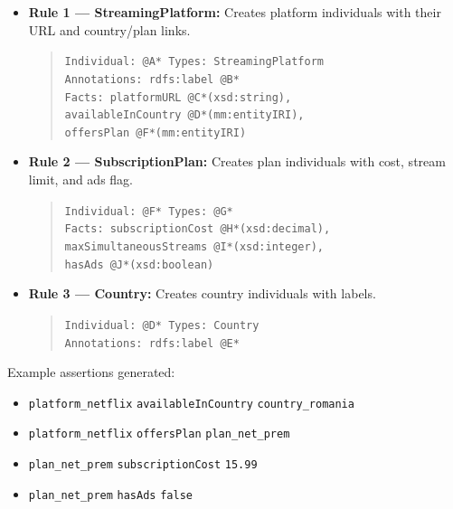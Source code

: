 \begin{itemize}
    \item \textbf{Rule 1 — StreamingPlatform:} Creates platform individuals with their URL and country/plan links.
    \begin{quote}\small
    \texttt{Individual: @A* \quad Types: StreamingPlatform}\\
    \texttt{Annotations: rdfs:label @B*}\\
    \texttt{Facts: platformURL @C*(xsd:string),}\\
    \texttt{\phantom{Facts: }availableInCountry @D*(mm:entityIRI),}\\
    \texttt{\phantom{Facts: }offersPlan @F*(mm:entityIRI)}
    \end{quote}

    \item \textbf{Rule 2 — SubscriptionPlan:} Creates plan individuals with cost, stream limit, and ads flag.
    \begin{quote}\small
    \texttt{Individual: @F* \quad Types: @G*}\\
    \texttt{Facts: subscriptionCost @H*(xsd:decimal),}\\
    \texttt{\phantom{Facts: }maxSimultaneousStreams @I*(xsd:integer),}\\
    \texttt{\phantom{Facts: }hasAds @J*(xsd:boolean)}
    \end{quote}

    \item \textbf{Rule 3 — Country:} Creates country individuals with labels.
    \begin{quote}\small
    \texttt{Individual: @D* \quad Types: Country}\\
    \texttt{Annotations: rdfs:label @E*}
    \end{quote}
\end{itemize}

\vspace{0.3cm}
\noindent Example assertions generated:
\begin{itemize}
    \item \texttt{platform\_netflix} \texttt{availableInCountry} \texttt{country\_romania}
    \item \texttt{platform\_netflix} \texttt{offersPlan} \texttt{plan\_net\_prem}
    \item \texttt{plan\_net\_prem} \texttt{subscriptionCost} \texttt{15.99}
    \item \texttt{plan\_net\_prem} \texttt{hasAds} \texttt{false}
\end{itemize}

